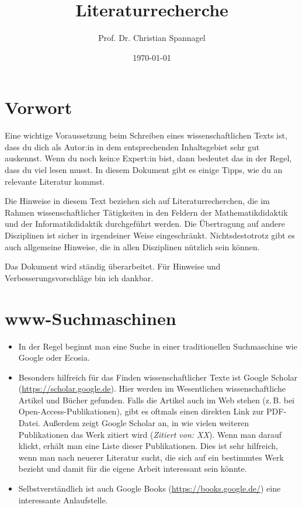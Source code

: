 \documentclass{../cssheet}
\title{Literaturrecherche}
\author{Prof. Dr. Christian Spannagel}
\date{\today}
\begin{document}
\printtitle
\printdate
\singlespacing

\tableofcontents

\section{Vorwort}

Eine wichtige Voraussetzung beim Schreiben eines wissenschaftlichen Texts ist, dass du dich als Autor:in in dem entsprechenden Inhaltsgebiet sehr gut auskennst. Wenn du noch kein:e Expert:in bist, dann bedeutet das in der Regel, dass du viel lesen musst. In diesem Dokument gibt es einige Tipps, wie du an relevante Literatur kommst.

Die Hinweise in diesem Text beziehen sich auf Literaturrecherchen, die im Rahmen wissenschaftlicher Tätigkeiten in den Feldern der Mathematikdidaktik und der Informatikdidaktik durchgeführt werden. Die Übertragung auf andere Disziplinen ist sicher in irgendeiner Weise eingeschränkt. Nichtsdestotrotz gibt es auch allgemeine Hinweise, die in allen Disziplinen nützlich sein können.

Das Dokument wird ständig überarbeitet. Für Hinweise und Verbesserungsvorschläge bin ich dankbar.

\section{www-Suchmaschinen}
\begin{itemize}
\item In der Regel beginnt man eine Suche in einer traditionellen Suchmaschine wie Google oder Ecosia.
\item Besonders hilfreich für das Finden wissenschaftlicher Texte ist Google Scholar (\url{https://scholar.google.de}). Hier werden im Wesentlichen wissenschaftliche Artikel und Bücher gefunden. Falls die Artikel auch im Web stehen (z.\,B. bei Open-Access-Publikationen), gibt es oftmals einen direkten Link zur PDF-Datei. Außerdem zeigt Google Scholar an, in wie vielen weiteren Publikationen das Werk zitiert wird (\emph{Zitiert von: XX}). Wenn man darauf klickt, erhält man eine Liste dieser Publikationen. Dies ist sehr hilfreich, wenn man nach neuerer Literatur sucht, die sich auf ein bestimmtes Werk bezieht und damit für die eigene Arbeit interessant sein könnte.
\item Selbstverständlich ist auch Google Books (\url{https://books.google.de/}) eine interessante Anlaufstelle.
\end{itemize}
\pagestyle{docstyle}
\end{document}
